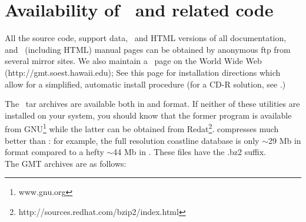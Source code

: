 %
%
\chapter{Availability of \gmt\ and related code}
\label{app:D}
\thispagestyle{headings}

All the source code, support data, \PS\,
and HTML versions of all documentation, and \UNIX\
(including HTML) manual pages can be obtained by anonymous
ftp from several mirror sites.  We also maintain a \GMT\
page on the World Wide Web (http://gmt.soest.hawaii.edu);
See this page for installation directions 
which allow for a simplified, automatic install procedure
(for a CD-R solution, see .)

The \GMT\ tar archives are available both in \progname{gzip}
and  format.  If neither of these utilities
are installed on your system, you should know that the former
program is available from GNU\footnote{www.gnu.org} while the
latter can be obtained from Redat\footnote{http://sources.redhat.com/bzip2/index.html}.
 compresses much better than :
for example, the full resolution coastline database is only
$\sim$29 Mb in \progname{bzip2} format compared to a hefty
$\sim$44 Mb in \progname{gzip}.  These files have the
.bz2 suffix. \\

The GMT archives are as follows:

